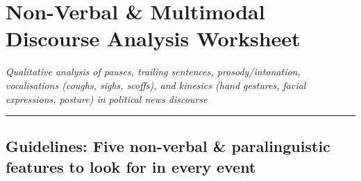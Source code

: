 \documentclass[10pt,a4paper]{article}
\begin{document}
\section*{Non-Verbal \& Multimodal Discourse Analysis Worksheet}

\textit{Qualitative analysis of pauses, trailing sentences, prosody/intonation, vocalisations (coughs, sighs, scoffs), and kinesics (hand gestures, facial expressions, posture) in political news discourse}\par\smallskip

\bigskip\hrule\bigskip

\subsection*{Guidelines: Five non-verbal \& paralinguistic features to look for in every event}
\end{document}

